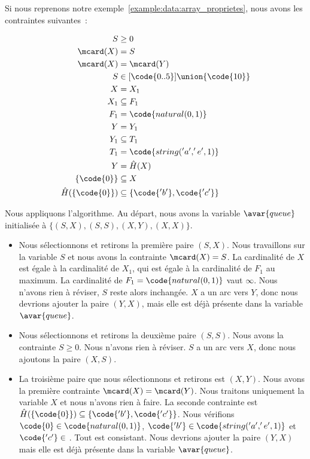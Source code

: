 \begin{example}

Si nous reprenons notre exemple~\ref{example:data:array_proprietes}, nous avons
les contraintes suivantes~:

\begin{align*}
%
S & \geq 0 \\
%
\mcard(X) & = S \\
%
\mcard(X) & = \mcard(Y) \\
%
S & \in [\code{0..5}] \union \{\code{10}\} \\
%
X & = X_1 \\
%
X_1 & \subseteq F_1 \\
%
F_1 & = \code{natural(0, 1)} \\
%
Y & = Y_1 \\
%
Y_1 & \subseteq T_1 \\
%
T_1 & = \code{string('a', 'e', 1)} \\
%
Y & = \hat{H}(X) \\
%
\{\code{0}\} & \subseteq X \\
%
\hat{H}(\{\code{0}\}) & \subseteq \{\code{'b'}, \code{'c'}\} \\
%
\end{align*}

Nous appliquons l'algorithme. Au départ, nous avons la variable $\avar{queue}$
initialisée à $\{(S, X), (S, S), (X, Y), (X, X)\}$.

\begin{itemize}

\item Nous sélectionnons et retirons la première paire $(S, X)$. Nous
travaillons sur la variable $S$ et nous avons la contrainte $\mcard(X) = S$. La
cardinalité de $X$ est égale à la cardinalité de $X_1$, qui est égale à la
cardinalité de $F_1$ au maximum. La cardinalité de $F_1 = \code{natural(0, 1)}$
vaut $\infty$. Nous n'avons rien à réviser, $S$ reste alors inchangée. $X$ a un
arc vers $Y$, donc nous devrions ajouter la paire $(Y, X)$, mais elle est déjà
présente dans la variable $\avar{queue}$.

\item Nous sélectionnons et retirons la deuxième paire $(S, S)$. Nous avons la
con\-train\-te $S \geq 0$. Nous n'avons rien à réviser. $S$ a un arc vers $X$,
donc nous ajoutons la paire $(X, S)$.

\item La troisième paire que nous sélectionnons et retirons est $(X, Y)$. Nous
avons la première contrainte $\mcard(X) = \mcard(Y)$. Nous traitons uniquement
la variable $X$ et nous n'avons rien à faire. La seconde contrainte est
$\hat{H}(\{\code{0}\}) \subseteq \{\code{'b'}, \code{'c'}\}$. Nous vérifions
$\code{0} \in \code{natural(0, 1)}$, $\code{'b'} \in \code{string('a', 'e', 1)}$
et $\code{'c'} \in$ . Tout est consistant. Nous
devrions ajouter la paire $(Y, X)$ mais elle est déjà présente dans la variable
$\avar{queue}$.


\end{itemize}
\end{example}
